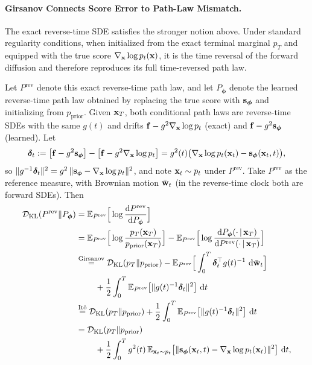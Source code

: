 \paragraph{Girsanov Connects Score Error to Path-Law Mismatch.}
The exact reverse-time SDE satisfies the stronger notion above. Under
standard regularity conditions, when initialized from the exact terminal
marginal $p_T$ and equipped with the true score
$\nabla_{{\mathbf{x}}}\log p_t({\mathbf{x}})$, it is the time reversal of the forward
diffusion and therefore reproduces its full time-reversed path law.

Let $P^{\mathrm{rev}}$ denote this exact reverse-time path law, and let
$P_{\bm{\phi}}$ denote the learned reverse-time path law obtained by
replacing the true score with ${\mathbf{s}}_{\bm{\phi}}$ and initializing from
$p_{\mathrm{prior}}$.
\begingroup\color{notesblue}%
Given ${\mathbf{x}}_T$, both conditional path laws are reverse-time SDEs with the same $g(t)$ and drifts ${\mathbf{f}} - g^2\nabla_{{\mathbf{x}}}\log p_t$ (exact) and ${\mathbf{f}} - g^2{\mathbf{s}}_{\bm{\phi}}$ (learned). Let
\[
\bm{\delta}_t := \big[{\mathbf{f}} - g^2{\mathbf{s}}_{\bm{\phi}}\big] - \big[{\mathbf{f}} - g^2\nabla_{{\mathbf{x}}}\log p_t\big]
= g^2(t)\big(\nabla_{{\mathbf{x}}}\log p_t({\mathbf{x}}_t) - {\mathbf{s}}_{\bm{\phi}}({\mathbf{x}}_t,t)\big),
\]
so $\|g^{-1}\bm{\delta}_t\|^2 = g^2\,\|{\mathbf{s}}_{\bm{\phi}} - \nabla_{{\mathbf{x}}}\log p_t\|^2$, and note ${\mathbf{x}}_t\sim p_t$ under $P^{\mathrm{rev}}$. Take $P^{\mathrm{rev}}$ as the reference measure, with Brownian motion $\bar{{\mathbf{w}}}_t$ (in the reverse-time clock both are forward SDEs). Then
\begin{align*}
\mathcal{D}_{\mathrm{KL}}(P^{\mathrm{rev}}\|P_{\bm{\phi}})
&= \E_{P^{\mathrm{rev}}}\Big[\log\frac{\diff P^{\mathrm{rev}}}{\diff P_{\bm{\phi}}}\Big] \\
&= \E_{P^{\mathrm{rev}}}\Big[\log\frac{p_T(\rvx_T)}{p_{\mathrm{prior}}(\rvx_T)}\Big]
 - \E_{P^{\mathrm{rev}}}\Big[\log\frac{\diff P_{\bm{\phi}}(\cdot\,|\,\rvx_T)}{\diff P^{\mathrm{rev}}(\cdot\,|\,\rvx_T)}\Big] \\
&\overset{\text{Girsanov}}{=} \mathcal{D}_{\mathrm{KL}}(p_T\|p_{\mathrm{prior}})
 - \E_{P^{\mathrm{rev}}}\Big[\int_0^T \bm{\delta}_t^\top g(t)^{-1}\,\diff\bar{\rvw}_t\Big] \\
&\qquad\; + \frac{1}{2}\int_0^T \E_{P^{\mathrm{rev}}}\big[\|g(t)^{-1}\bm{\delta}_t\|^2\big]\,\diff t \\
&\overset{\text{It\^o}}{=} \mathcal{D}_{\mathrm{KL}}(p_T\|p_{\mathrm{prior}})
 + \frac{1}{2}\int_0^T \E_{P^{\mathrm{rev}}}\big[\|g(t)^{-1}\bm{\delta}_t\|^2\big]\,\diff t \\
&= \mathcal{D}_{\mathrm{KL}}(p_T\|p_{\mathrm{prior}}) \\
&\qquad\; + \frac{1}{2}\int_0^T g^2(t)\,\E_{\rvx_t\sim p_t}\big[\|\rvs_{\bm{\phi}}(\rvx_t,t) - \nabla_{\rvx}\log p_t(\rvx_t)\|^2\big]\,\diff t ,
\end{align*}
